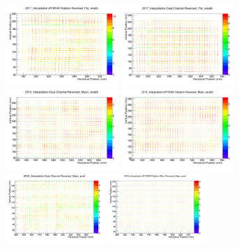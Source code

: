 \documentclass[hidelinks,11pt]{article}
\numberwithin{figure}{section}
\numberwithin{table}{section}
\begin{document}
\begin{figure}[hbtp]
\begin{center}
\includegraphics[width=0.38\textwidth]{Plots/EnpoFitsMethod/EnPo20172ndScan.png}
\includegraphics[width=0.38\textwidth]{Plots/EnpoFitsMethod/EnPo20173rdScan.png}
\includegraphics[width=0.38\textwidth]{Plots/EnpoFitsMethod/EnPo20183rdScan.png}
\includegraphics[width=0.38\textwidth]{Plots/EnpoFitsMethod/EnPo20184thScan.png}
\includegraphics[width=0.33\textwidth]{Plots/EnpoFitsMethod/EnPo20185thScan.png}
\includegraphics[width=0.33\textwidth]{Plots/EnpoFitsMethod/EnPo20186thScan.png}

\end{center}
\end{figure}
\end{document}
